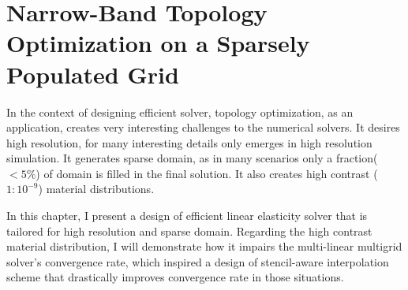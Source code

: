 \chapter{Narrow-Band Topology Optimization on a Sparsely Populated Grid} 
\label{Chapter:Elasticity}
In the context of designing efficient solver, topology optimization, as an application, creates very interesting challenges to the numerical solvers. It desires high resolution, for many interesting details only emerges in high resolution simulation. It generates sparse domain, as in many scenarios only a fraction($<5\%$) of domain is filled in the final solution. It also creates high contrast ($1:10^{-9}$) material distributions. 

In this chapter, I present a design of efficient linear elasticity solver that is tailored for high resolution and sparse domain. Regarding the high contrast material distribution, I will demonstrate how it impairs the multi-linear multigrid solver's convergence rate, which inspired a design of stencil-aware interpolation scheme that drastically improves convergence rate in those situations.




